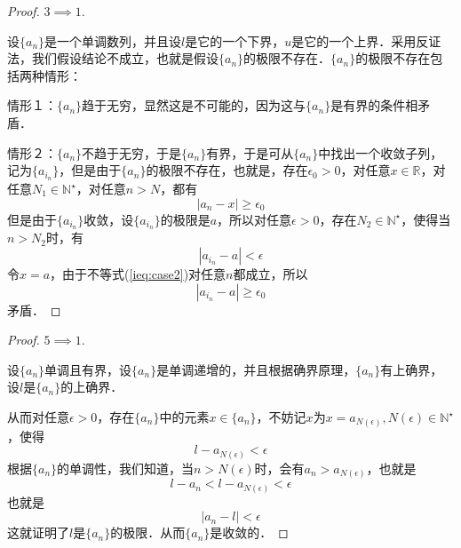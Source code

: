 \documentclass{ctexart}
\theoremstyle{definition}
\theoremstyle{definition}
\theoremstyle{plain}
\theoremstyle{plain}
\theoremstyle{plain}
\theoremstyle{definition}
\newcommand{\nat}{\mathbb{N}^\star}
\begin{document}
\begin{proof}
$3 \implies 1$.

\noindent 设$\{a_n\}$是一个单调数列，并且设$l$是它的一个下界，$u$是它的一个上界．采用反证法，我们假设结论不成立，也就是假设$\{a_n\}$的极限不存在．$\{a_n\}$的极限不存在包括两种情形：

\noindent 情形１：$\{a_n\}$趋于无穷，显然这是不可能的，因为这与$\{a_n\}$是有界的条件相矛盾．

\noindent 情形２：$\{a_n\}$不趋于无穷，于是$\{a_n\}$有界，于是可从$\{a_n\}$中找出一个收敛子列，记为$\{a_{i_n}\}$，但是由于$\{a_n\}$的极限不存在，也就是，存在$\epsilon_0 > 0$，对任意$x \in \mathbb{R}$，对任意$N_1 \in \nat$，对任意$n > N$，都有
\begin{equation}
    |a_n - x| \geq \epsilon_0
\end{equation}
但是由于$\{a_{i_n}\}$收敛，设$\{a_{i_n}\}$的极限是$a$，所以对任意$\epsilon > 0$，存在$N_2 \in \nat$，使得当$n > N_2$时，有
\begin{equation}
    |a_{i_n} - a| < \epsilon
    \label{ieq:case2}
\end{equation}
令$x = a$，由于不等式(\ref{ieq:case2})对任意$n$都成立，所以
\begin{equation}
    |a_{i_n} - a|\geq \epsilon_0
\end{equation}
矛盾．
\end{proof}

\begin{proof}
$5 \implies 1$.

\noindent 设$\{a_n\}$单调且有界，设$\{a_n\}$是单调递增的，并且根据确界原理，$\{a_n\}$有上确界，设$l$是$\{a_n\}$的上确界．

\noindent 从而对任意$\epsilon > 0$，存在$\{a_n\}$中的元素$x \in \{a_n\}$，不妨记$x$为$x=a_{N(\epsilon)}, N(\epsilon) \in \nat$，使得
\begin{equation}
    l - a_{N(\epsilon)} < \epsilon
\end{equation}
根据$\{a_n\}$的单调性，我们知道，当$n > N(\epsilon)$时，会有$a_n > a_{N(\epsilon)}$，也就是
\begin{equation}
    l - a_n < l - a_{N(\epsilon)} < \epsilon
\end{equation}
也就是
\begin{equation}
    |a_n - l| < \epsilon
\end{equation}
这就证明了$l$是$\{a_n\}$的极限．从而$\{a_n\}$是收敛的．
\end{proof}
\end{document}
